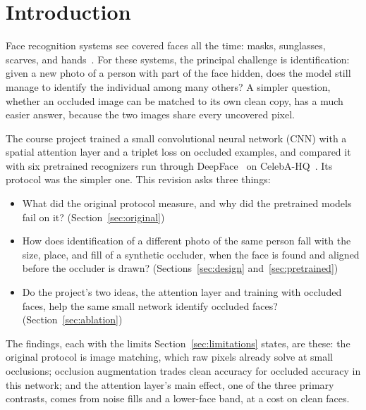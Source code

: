 \section{Introduction}

Face recognition systems see covered faces all the time: masks, sunglasses, scarves, and hands~\cite{zeng2021survey,deng2021mfr}. For these systems, the principal challenge is identification: given a new photo of a person with part of the face hidden, does the model still manage to identify the individual among many others? A simpler question, whether an occluded image can be matched to its own clean copy, has a much easier answer, because the two images share every uncovered pixel.

The course project trained a small convolutional neural network (CNN) with a spatial attention layer and a triplet loss on occluded examples, and compared it with six pretrained recognizers run through DeepFace~\cite{serengil2020lightface} on CelebA-HQ~\cite{karras2018pggan}. Its protocol was the simpler one. This revision asks three things:
\begin{itemize}
\item What did the original protocol measure, and why did the pretrained models fail on it? (Section~\ref{sec:original})
\item How does identification of a different photo of the same person fall with the size, place, and fill of a synthetic occluder, when the face is found and aligned before the occluder is drawn? (Sections~\ref{sec:design} and~\ref{sec:pretrained})
\item Do the project's two ideas, the attention layer and training with occluded faces, help the same small network identify occluded faces? (Section~\ref{sec:ablation})
\end{itemize}
The findings, each with the limits Section~\ref{sec:limitations} states, are these: the original protocol is image matching, which raw pixels already solve at small occlusions; occlusion augmentation trades clean accuracy for occluded accuracy in this network; and the attention layer's main effect, one of the three primary contrasts, comes from noise fills and a lower-face band, at a cost on clean faces.
